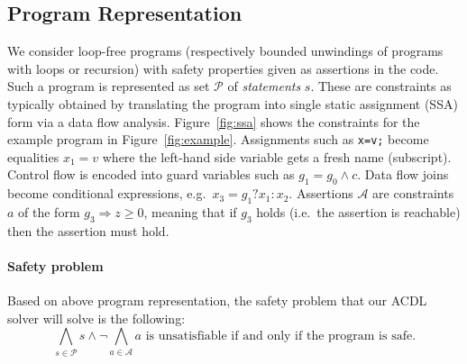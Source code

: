 \subsection{Program Representation}  
%
We consider loop-free programs (respectively bounded unwindings of
programs with loops or recursion) with safety properties given as
assertions in the code.
%
Such a program is represented as set $\mathcal{P}$ of
\emph{statements} $s$.  These are constraints as typically obtained by
translating the program into single static assignment (SSA) form via a
data flow analysis.
%
Figure~\ref{fig:ssa} shows the constraints for the example program in
Figure~\ref{fig:example}.
%
Assignments such as \texttt{x=v;} become equalities $x_1=v$ where the
left-hand side variable gets a fresh name (subscript).
%
Control flow is encoded into guard variables such as $g_1=g_0\wedge c$.
%
Data flow joins become conditional expressions, e.g.\ $x_3=g_1?x_1:x_2$.
%
Assertions $\mathcal{A}$ are constraints $a$ of the form $g_3
\Rightarrow z\geq 0$, meaning that if $g_3$ holds (i.e.\ the assertion
is reachable) then the assertion must hold.


% 

\paragraph{Safety problem}  
%
Based on above program representation, the safety problem that our
ACDL solver will solve is the following:
%
\begin{equation}\label{eq:safety}
\bigwedge_{s\in\mathcal{P}} s \wedge \neg \bigwedge_{a\in\mathcal{A}} a
\text{ is unsatisfiable if and only if the program is safe.}
\end{equation}

